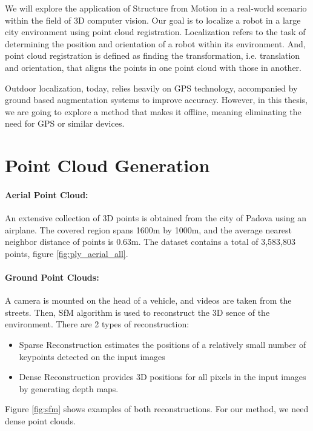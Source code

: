 \documentclass[11pt]{article}
\begin{document}
    We will explore the application of Structure from Motion in a real-world scenario within the field of 3D
    computer vision. Our goal is to localize a robot in a large city environment using point cloud registration.
    Localization refers to the task of determining the position and orientation of a robot within its environment.
    And, point cloud registration is defined as finding the transformation, i.e. translation and orientation,
    that aligns the points in one point cloud with those in another.

    Outdoor localization, today, relies heavily on GPS technology, accompanied by ground based augmentation systems
    to improve accuracy. However, in this thesis, we are going to explore a method that makes it offline, meaning
    eliminating the need for GPS or similar devices.

    \section{Point Cloud Generation}
    \paragraph{Aerial Point Cloud:} An extensive collection of 3D points is obtained from the city of Padova
    using an airplane. The covered region spans 1600m by 1000m, and the average nearest neighbor distance
    of points is 0.63m. The dataset contains a total of 3,583,803 points, figure \ref{fig:ply_aerial_all}.
    \paragraph{Ground Point Clouds:}
    A camera is mounted on the head of a vehicle, and videos are taken from the streets. Then, SfM algorithm is used to
    reconstruct the 3D sence of the environment. There are 2 types of reconstruction:
    \begin{itemize}
        \item Sparse Reconstruction estimates the positions of a relatively small number of keypoints detected on the input images
        \item Dense Reconstruction provides 3D positions for all pixels in the input images by generating depth maps.
    \end{itemize}

    Figure \ref{fig:sfm} shows examples of both reconstructions.
    For our method, we need dense point clouds.
\end{document}
